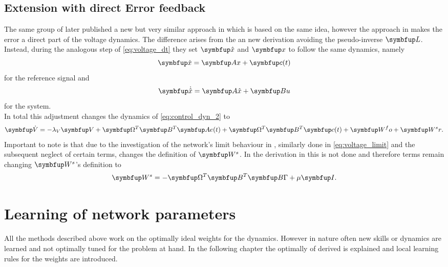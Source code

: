 \subsection{Extension with direct Error feedback}\label{ssec:extension}
The same group of \cite{huang_optimizing_2017} later published a new but very similar approach in \cite{huang_spiking_2019} which is based on the same idea, however the approach in \cite{huang_spiking_2019} makes the error a direct part of the voltage dynamics. The difference arises from the an new derivation avoiding the pseudo-inverse $\bmu{L}$.\\
Instead, during the analogous step of \cref{eq:voltage_dt} they set $\bmu{\hat{x}}$
and $\bmu{x}$ to follow the same dynamics, namely
\begin{equation}\label{eq:feedback_c2}
	\bmu{\dot{x}} = \bmu{Ax} + \bmu{c}(t)
\end{equation}
for the reference signal and
\begin{equation}
	\bmu{\dot{\hat{x}}} = \bmu{A\hat{x}} + \bmu{Bu}
\end{equation}
for the system.\\
In total this adjustment changes the dynamics of \cref{eq:control_dyn_2} to
\begin{equation}
	\bmu{\dot{V}} = -\lambda_V\bmu{V} + \bmu{\Omega}^T \bmu{B}^T\bmu{Ae}(t) + \bmu{\Omega}^T \bmu{B}^T \bmu{c}(t) + \bmu{W^fo} + \bmu{W^sr}.
\end{equation}
Important to note is that due to the investigation of the network's limit behaviour in \cite{huang_optimizing_2017}, similarly done in \cref{eq:voltage_limit} and the subsequent neglect of certain terms, changes the definition of $\bmu{W^s}$. In the derivation in \cite{huang_spiking_2019} this is not done and therefore terms remain changing $\bmu{W^s}$'s definition to
\begin{equation}
	\bmu{W^s} = -\bmu{\Omega}^T\bmu{B}^T\bmu{B\Gamma} + \mu\bmu{I}.
\end{equation}


\section{Learning of network parameters}\label{sec:learning}
All the methods described above work on the optimally ideal weights for the dynamics. However in nature often new skills or dynamics are learned and not optimally tuned for the problem at hand. In the following chapter the optimally of derived is explained and local learning rules for the weights are introduced.\\


